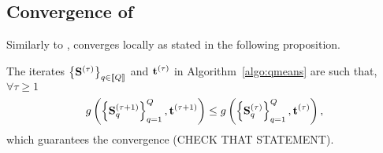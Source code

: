 \iffalse
\begin{remark}[Assignment/Re-estimation trade-off.]
A strategy to tackle this problem would be to first run the vanilla K-means algorithm,
 obtain the matrix of centers $U$ and then encode $U$ as a product of sparse matrices
 using Hierarchical Palm4MSA. This would however prevent us from taking advantage of 
 the expected low complexity product that plays a role in the assignement step of 
 the procedure.
\end{remark}

\todo[inline]{At some point, talk about the trade-off that we are playing with
regarding the cost of the assignment and the cost of the re-estimation procedure.}
\fi

\subsection{Convergence of \qkmeans}
\label{sec:qkmeans:convergence}
Similarly to \kmeans, \qkmeans converges locally as stated in the following proposition.

\begin{proposition}
\label{thm:convergence}
The iterates $\left \lbrace{\mathbf{S}}^{(\tau)} \right \rbrace_{q\in\left \llbracket Q\right \rrbracket}$ and ${\mathbf{t}}^{(\tau)}$ in Algorithm~\ref{algo:qmeans} are such that, $\forall \tau\geq 1$
\begin{equation*}
g\left(\left\{{\mathbf{S}}_q^{(\tau+1)}\right\}_{q=1}^{Q}, {\mathbf{t}}^{(\tau+1)}\right)
\leq g\left(\left\{{\mathbf{S}}_q^{(\tau)}\right\}_{q=1}^{Q}, {\mathbf{t}}^{(\tau)}\right),
\end{equation*}
which guarantees the convergence (CHECK THAT STATEMENT).

\iffalse
\begin{equation}
\begin{split}
\label{eq:qmean_problem_2}
    g(\rmS_1^{(\tau)}, \ldots,\rmS_\nfactors^{(\tau)}, \rvt^{(\tau)} ) & \\
    = \sum_{k\in\intint{\nclusters}} \sum_{n: \rvt^{(\tau)}_n = k} & \norm{\rvx_n - \rvv^{(\tau)}_k}^2 + \sum_{q\in\intint{\nfactors}} \delta_{\mathcal{E}_q}\left (\rmS_q^{(\tau)}\right ) \\
    \text{ s.t. } \rmV = \prod_{q\in\intint{\nfactors}} & {\rmS_q^{(\tau)}}
\end{split} %
\end{equation}
\fi
\end{proposition}



